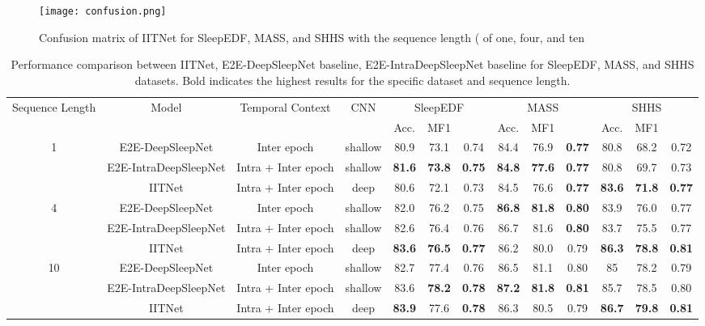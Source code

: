 \documentclass[10pt,twocolumn,twoside]{IEEEtran}
\begin{document}
    \begin{figure*}[!]
    \centering
        \texttt{[image: confusion.png]}
        \caption{Confusion matrix of IITNet for SleepEDF, MASS, and SHHS with the sequence length ( of one, four, and ten}  
        \label{fig:confusion}
    \end{figure*}
    

    \begin{table*}[]
        \centering
        \begin{tabular}{@{}c|ccc|ccc|ccc|ccc@{}}
        \toprule
        \multirow{2}{*}{Sequence Length} & \multirow{2}{*}{Model} & \multirow{2}{*}{Temporal Context} & \multirow{2}{*}{CNN} & \multicolumn{3}{c|}{SleepEDF} & \multicolumn{3}{c|}{MASS} & \multicolumn{3}{c}{SHHS} \\ \cmidrule(l){5-13} 
         &  &  &  & Acc. & MF1 &  & Acc. & MF1 &  & Acc. & MF1 &  \\ \midrule
        \multirow{3}{*}{1} & E2E-DeepSleepNet & Inter epoch & shallow & 80.9 & 73.1 & 0.74 & 84.4 & 76.9 & \textbf{0.77} & 80.8 & 68.2 & 0.72 \\
         & E2E-IntraDeepSleepNet & Intra + Inter epoch & shallow & \textbf{81.6} & \textbf{73.8} & \textbf{0.75} & \textbf{84.8} & \textbf{77.6} & \textbf{0.77} & 80.8 & 69.7 & 0.73 \\
         & IITNet & Intra + Inter epoch & deep & 80.6 & 72.1 & 0.73 & 84.5 & 76.6 & \textbf{0.77} & \textbf{83.6} & \textbf{71.8} & \textbf{0.77} \\ \midrule
        \multirow{3}{*}{4} & E2E-DeepSleepNet & Inter epoch & shallow & 82.0 & 76.2 & 0.75 & \textbf{86.8} & \textbf{81.8} & \textbf{0.80} & 83.9 & 76.0 & 0.77 \\
         & E2E-IntraDeepSleepNet & Intra + Inter epoch & shallow & 82.6 & 76.4 & 0.76 & 86.7 & 81.6 & \textbf{0.80} & 83.7 & 75.5 & 0.77 \\
         & IITNet & Intra + Inter epoch & deep & \textbf{83.6} & \textbf{76.5} & \textbf{0.77} & 86.2 & 80.0 & 0.79 & \textbf{86.3} & \textbf{78.8} & \textbf{0.81} \\ \midrule
        \multirow{3}{*}{10} & E2E-DeepSleepNet & Inter epoch & shallow & 82.7 & 77.4 & 0.76 & 86.5 & 81.1 & 0.80 & 85 & 78.2 & 0.79 \\
         & E2E-IntraDeepSleepNet & Intra + Inter epoch & shallow & 83.6 & \textbf{78.2} & \textbf{0.78} & \textbf{87.2} & \textbf{81.8} & \textbf{0.81} & 85.7 & 78.5 & 0.80 \\
         & IITNet & Intra + Inter epoch & deep & \textbf{83.9} & 77.6 & \textbf{0.78} & 86.3 & 80.5 & 0.79 & \textbf{86.7} & \textbf{79.8} & \textbf{0.81} \\ \bottomrule
        \end{tabular}
     \caption{Performance comparison between IITNet, E2E-DeepSleepNet baseline, E2E-IntraDeepSleepNet baseline for SleepEDF, MASS, and SHHS datasets. Bold indicates the highest results for the specific dataset and sequence length.}
     \label{table:baselines}
    \end{table*}
    
\end{document}
